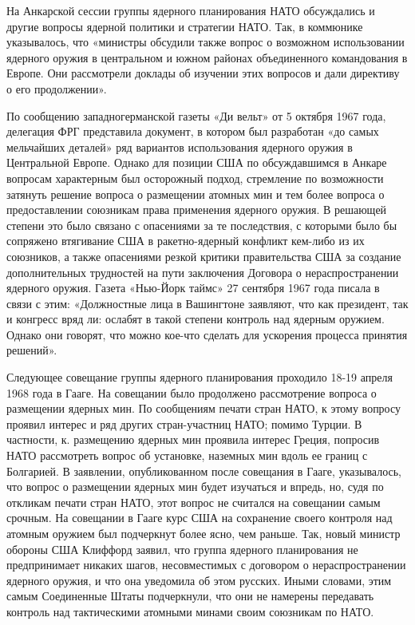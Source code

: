\documentclass[12pt, a4paper, openany]{book}
\begin{document}
	На Анкарской сессии группы ядерного планирования НАТО обсуждались и другие вопросы ядерной политики и стратегии НАТО. Так, в коммюнике указывалось, что «министры обсудили также вопрос о возможном использовании ядерного оружия в центральном и южном районах объединенного командования в Европе. Они рассмотрели доклады об изучении этих вопросов и дали директиву о его продолжении».
	
	По сообщению западногерманской газеты «Ди вельт» от 5 октября 1967 года, делегация ФРГ представила документ, в котором был разработан «до самых мельчайших деталей» ряд вариантов использования ядерного оружия в Центральной Европе. Однако для позиции США по обсуждавшимся в Анкаре вопросам характерным был осторожный подход, стремление по возможности затянуть решение вопроса о размещении атомных мин и тем более вопроса о предоставлении союзникам права применения ядерного оружия. В решающей степени это было связано с опасениями за те последствия, с которыми было бы сопряжено втягивание США в ракетно-ядерный конфликт кем-либо из их союзников, а также опасениями резкой критики правительства США за создание дополнительных трудностей на пути заключения Договора о нераспространении ядерного оружия. Газета «Нью-Йорк таймс» 27 сентября 1967 года писала в связи с этим: «Должностные лица в Вашингтоне заявляют, что как президент, так и конгресс вряд ли: ослабят в такой степени контроль над ядерным оружием. Однако они говорят, что можно кое-что сделать для ускорения процесса принятия решений».
	
	Следующее совещание группы ядерного планирования проходило 18-19 апреля 1968 года в Гааге. На совещании было продолжено рассмотрение вопроса о размещении ядерных мин. По сообщениям печати стран НАТО, к этому вопросу проявил интерес и ряд других стран-участниц НАТО; помимо Турции. В частности, к. размещению ядерных мин проявила интерес Греция, попросив НАТО рассмотреть вопрос об установке, наземных мин вдоль ее границ с Болгарией. В заявлении, опубликованном после совещания в Гааге, указывалось, что вопрос о размещении ядерных мин будет изучаться и впредь, но, судя по откликам печати стран НАТО, этот вопрос не считался на совещании самым срочным. На совещании в Гааге курс США на сохранение своего контроля над атомным оружием был подчеркнут более ясно, чем раньше. Так, новый министр обороны США Клиффорд заявил, что группа ядерного планирования не предпринимает никаких шагов, несовместимых с договором о нераспространении ядерного оружия, и что она уведомила об этом русских. Иными словами, этим самым Соединенные Штаты подчеркнули, что они не намерены передавать контроль над тактическими атомными минами своим союзникам по НАТО.
	
\end{document}
